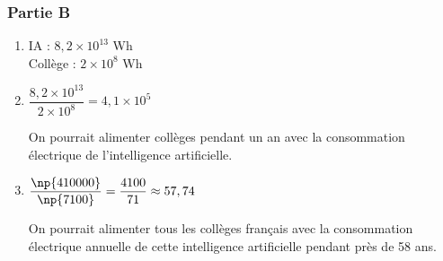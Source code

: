 \bigskip

\subsubsection*{Partie B}

%
%
%
%
%

\begin{enumerate}[resume]
	\item IA : $8,2\times 10^{13}$ Wh\\
	Collège : $2\times 10^8$ Wh
	\item $\dfrac{8,2\times 10^{13}}{2\times 10^8}=4,1\times 10 ^5$
	
	On pourrait alimenter  collèges pendant un an avec la consommation électrique de l'intelligence artificielle.
	\item $\dfrac{\np{410000}}{\np{7100}}=\dfrac{4100}{71}\approx 57,74$

	On pourrait alimenter tous les collèges français avec la consommation électrique annuelle de cette intelligence artificielle pendant près de 58 ans.
\end{enumerate}



